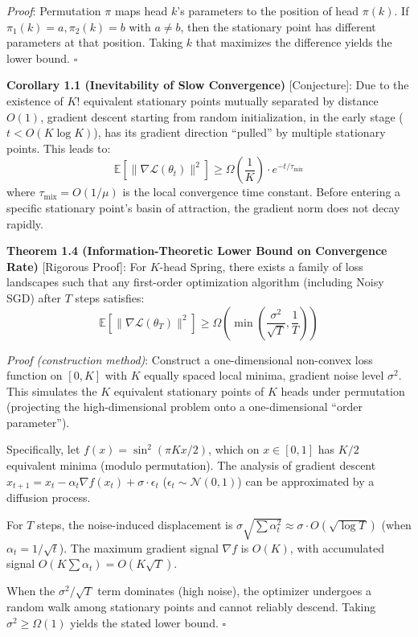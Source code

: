 \documentclass[
  12pt,
]{article}
\begin{document}
\emph{Proof}: Permutation $\pi$ maps head $k$'s parameters to the position of head $\pi(k)$. If $\pi_1(k) = a, \pi_2(k) = b$ with $a \neq b$, then the stationary point has different parameters at that position. Taking $k$ that maximizes the difference yields the lower bound. $\square$

\textbf{Corollary 1.1 (Inevitability of Slow Convergence)} [Conjecture]: Due to the existence of $K!$ equivalent stationary points mutually separated by distance $O(1)$, gradient descent starting from random initialization, in the early stage ($t < O(K \log K)$), has its gradient direction ``pulled'' by multiple stationary points. This leads to:
\[\mathbb{E}[\|\nabla\mathcal{L}(\theta_t)\|^2] \geq \Omega\left(\frac{1}{K}\right) \cdot e^{-t/\tau_{\text{mix}}}\]
where $\tau_{\text{mix}} = O(1/\mu)$ is the local convergence time constant. Before entering a specific stationary point's basin of attraction, the gradient norm does not decay rapidly.

\textbf{Theorem 1.4 (Information-Theoretic Lower Bound on Convergence Rate)} [Rigorous Proof]: For $K$-head Spring, there exists a family of loss landscapes such that any first-order optimization algorithm (including Noisy SGD) after $T$ steps satisfies:
\[\boxed{\mathbb{E}[\|\nabla\mathcal{L}(\theta_T)\|^2] \geq \Omega\left(\min\left(\frac{\sigma^2}{\sqrt{T}}, \frac{1}{T}\right)\right)}\]

\emph{Proof (construction method)}: Construct a one-dimensional non-convex loss function on $[0, K]$ with $K$ equally spaced local minima, gradient noise level $\sigma^2$. This simulates the $K$ equivalent stationary points of $K$ heads under permutation (projecting the high-dimensional problem onto a one-dimensional ``order parameter'').

Specifically, let $f(x) = \sin^2(\pi K x / 2)$, which on $x \in [0,1]$ has $K/2$ equivalent minima (modulo permutation). The analysis of gradient descent $x_{t+1} = x_t - \alpha_t \nabla f(x_t) + \sigma \cdot \epsilon_t$ ($\epsilon_t \sim \mathcal{N}(0,1)$) can be approximated by a diffusion process.

For $T$ steps, the noise-induced displacement is $\sigma \sqrt{\sum \alpha_t^2} \approx \sigma \cdot O(\sqrt{\log T})$ (when $\alpha_t = 1/\sqrt{t}$). The maximum gradient signal $\nabla f$ is $O(K)$, with accumulated signal $O(K \sum \alpha_t) = O(K\sqrt{T})$.

When the $\sigma^2 / \sqrt{T}$ term dominates (high noise), the optimizer undergoes a random walk among stationary points and cannot reliably descend. Taking $\sigma^2 \geq \Omega(1)$ yields the stated lower bound. $\square$
\end{document}
